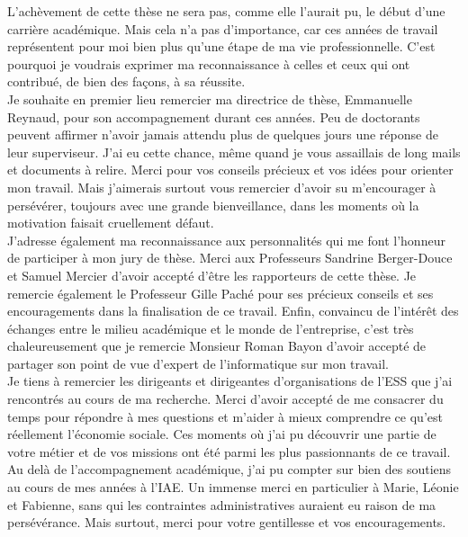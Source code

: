 

L'achèvement de cette thèse ne sera pas, comme elle l'aurait pu, le début d'une carrière académique. Mais cela n'a pas d'importance, car ces années de travail représentent pour moi bien plus qu'une étape de ma vie professionnelle. C'est pourquoi je voudrais exprimer ma reconnaissance à celles et ceux qui ont contribué, de bien des façons, à sa réussite. \\

Je souhaite en premier lieu remercier ma directrice de thèse, Emmanuelle Reynaud, pour son accompagnement durant ces années. Peu de doctorants peuvent affirmer n'avoir jamais attendu plus de quelques jours une réponse de leur superviseur. J'ai eu cette chance, même quand je vous assaillais de long mails et documents à relire.  Merci pour vos conseils précieux et vos idées pour orienter mon travail. Mais j'aimerais surtout vous remercier d'avoir su m'encourager à persévérer, toujours avec une grande bienveillance, dans les moments où la motivation faisait cruellement défaut. \\

J'adresse également ma reconnaissance aux personnalités qui me font l'honneur de participer à mon jury de thèse. Merci aux Professeurs Sandrine Berger-Douce et Samuel Mercier d'avoir accepté d'être les rapporteurs de cette thèse. Je remercie également le Professeur Gille Paché pour ses précieux conseils et ses encouragements dans la finalisation de ce travail. Enfin, convaincu de l'intérêt des échanges entre le milieu académique et le monde de l'entreprise, c'est très chaleureusement que je remercie Monsieur Roman Bayon d'avoir accepté de partager son point de vue d'expert de l'informatique sur mon travail. \\

Je tiens à remercier les dirigeants et dirigeantes d'organisations de l'ESS que j'ai rencontrés au cours de ma recherche. Merci d'avoir accepté de me consacrer du temps pour répondre à mes questions et m'aider à mieux comprendre ce qu'est réellement l'économie sociale. Ces moments où j'ai pu découvrir une partie de votre métier et de vos missions ont été parmi les plus passionnants de ce travail. \\

Au delà de l'accompagnement académique, j'ai pu compter sur bien des soutiens au cours de mes années  à l'IAE. Un immense merci en particulier à Marie, Léonie et Fabienne, sans qui les contraintes administratives auraient eu raison de ma persévérance. Mais surtout, merci pour votre gentillesse et vos encouragements. \\

